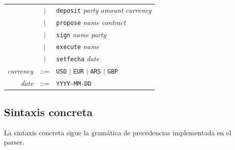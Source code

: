 \documentclass[a4paper, 12pt]{article}
\begin{document}
\begin{center}
\begin{tabular}{r c l}
    & $|$ & \texttt{deposit} \textit{party} \textit{amount} \textit{currency} \\
    & $|$ & \texttt{propose} \textit{name} \textit{contract} \\
    & $|$ & \texttt{sign} \textit{name} \textit{party} \\
    & $|$ & \texttt{execute} \textit{name} \\
    & $|$ & \texttt{setfecha} \textit{date} \\[10pt]
\textit{currency} & ::= & \texttt{USD} $|$ \texttt{EUR} $|$ \texttt{ARS} $|$ \texttt{GBP} \\[5pt]
\textit{date} & ::= & \texttt{YYYY-MM-DD} \\
\end{tabular}
\end{center}

\subsection{Sintaxis concreta}

La sintaxis concreta sigue la gramática de precedencias implementada en el parser.
\end{document}

